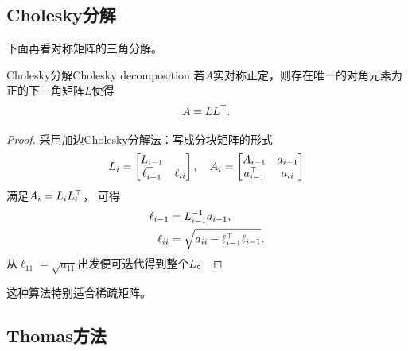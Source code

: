\subsection{Cholesky分解}

下面再看对称矩阵的三角分解。

\begin{theorem}
    {Cholesky分解}{Cholesky decomposition}
    若$A$实对称正定，则存在唯一的对角元素为正的下三角矩阵$L$使得
    \begin{equation}
        A=LL^\top.
    \end{equation}
\end{theorem}

\begin{proof}
    采用加边Cholesky分解法：写成分块矩阵的形式
    \[
        L_i=\begin{bmatrix}
            L_{i-1}\\\ell_{i-1}^\top&\ell_{ii}
        \end{bmatrix},\quad A_i=\begin{bmatrix}
            A_{i-1}&a_{i-1}\\ a_{i-1}^\top&a_{ii}
        \end{bmatrix}
    \]
    满足$A_i=L_iL_i^\top$，
    可得 
    \begin{subequations}
        \begin{align}
            \ell_{i-1}&=L_{i-1}^{-1} a_{i-1},\\
            \ell_{ii}&=\sqrt{a_{ii}-\ell_{i-1}^\top\ell_{i-1}}.
        \end{align}
    \end{subequations}
    从$\ell_{11}=\sqrt{a_{11}}$出发便可迭代得到整个$L$。
\end{proof}

\begin{remark}
    这种算法特别适合稀疏矩阵。
\end{remark}

\subsection{Thomas方法}

